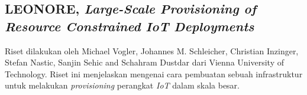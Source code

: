 \subsection{LEONORE, \textit{Large-Scale Provisioning of
    Resource Constrained
    IoT Deployments}}
Riset dilakukan oleh Michael Vogler, Johannes M. Schleicher, Christian Inzinger, Stefan Nastic, Sanjin Sehic and Schahram Dustdar dari Vienna University of Technology. Riset ini menjelaskan mengenai cara pembuatan sebuah infrastruktur untuk melakukan \textit{provisioning} perangkat \textit{IoT} dalam skala besar.